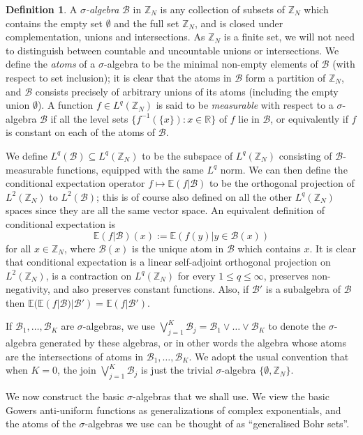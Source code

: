 \documentclass[12pt,a4paper,reqno]{amsart}
\numberwithin{equation}{section}
\theoremstyle{plain}
\theoremstyle{definition}
\newtheorem{definition}[subsection]{Definition}
\renewcommand{\leq}{\leqslant}
\def\B{{\mathcal B}}
\def\Z{{\mathbb Z}}
\def\E{{\mathbb E}}
\def\R{{\mathbb R}}
\def\vs{\vspace{11pt}}
\def\ni{\noindent}
\def\emph#1{{\it #1}}
\begin{document}
\begin{definition}\label{sigma-def}  A \emph{$\sigma$-algebra} $\B$ in $\mathbb{Z}_N$ is any collection
of subsets of $\mathbb{Z}_N$ which contains the empty set $\emptyset$ and the full set $\Z_N$, and is closed under
complementation, unions and intersections.  As $\mathbb{Z}_N$ is a finite set, we will not need to distinguish between countable and uncountable unions or intersections.  We define the \emph{atoms} of a $\sigma$-algebra to be the minimal non-empty elements of $\B$ (with respect to set inclusion); it is clear that the atoms in $\B$ form a partition of $\mathbb{Z}_N$, and $\B$ consists precisely of arbitrary unions of its atoms (including the empty union $\emptyset$).
A function $f \in L^q(\mathbb{Z}_N)$ is said to be \emph{measurable} with respect to a $\sigma$-algebra $\B$ if all the level 
sets $\{f^{-1}(\{x\}): x \in \R \}$ of $f$ lie in $\B$, or equivalently if $f$ is constant on each of the atoms of $\B$.  \vs

\ni We define $L^q(\B) \subseteq L^q(\mathbb{Z}_N)$ to be the subspace of $L^q(\mathbb{Z}_N)$ consisting of $\B$-measurable functions,
equipped with the same $L^q$ norm.  We can then define the conditional expectation operator $f \mapsto \E(f|\B)$ to
be the orthogonal projection of $L^2(\mathbb{Z}_N)$ to $L^2(\B)$; this is of course also defined on all the other $L^q(\mathbb{Z}_N)$
spaces since they are all the same vector space.  An equivalent definition of conditional expectation is
$$ \E(f|\B)(x) := \E( f(y) | y \in \B(x) )$$
for all $x \in \mathbb{Z}_N$, where $\B(x)$ is the unique atom in $\B$ which contains $x$.  It is clear that conditional
expectation is a linear self-adjoint orthogonal projection on $L^2(\mathbb{Z}_N)$, is a contraction on $L^q(\mathbb{Z}_N)$ for
every $1 \leq q \leq \infty$, preserves non-negativity, and also preserves constant functions.  Also, if $\B'$ is a
subalgebra of $\B$ then $\E(\E(f|\B) | \B') = \E(f|\B')$.\vs

\ni If $\B_1, \ldots, \B_K$ are $\sigma$-algebras, we use $\bigvee_{j=1}^K \B_j = \B_1 \vee \ldots \vee \B_K$ to denote the $\sigma$-algebra generated by these algebras, or in other words the algebra whose atoms are the intersections of atoms in $\B_1, \ldots, \B_K$.  We adopt the usual convention that when $K=0$, the join $\bigvee_{j=1}^K \B_j$ is just the trivial $\sigma$-algebra $\{ \emptyset, \Z_N\}$.
\end{definition}

\ni We now construct the basic $\sigma$-algebras that we shall use.  We view the basic Gowers anti-uniform functions as generalizations of complex exponentials,
and the atoms of the $\sigma$-algebras we use can be thought of as ``generalised Bohr sets''.
\end{document}
